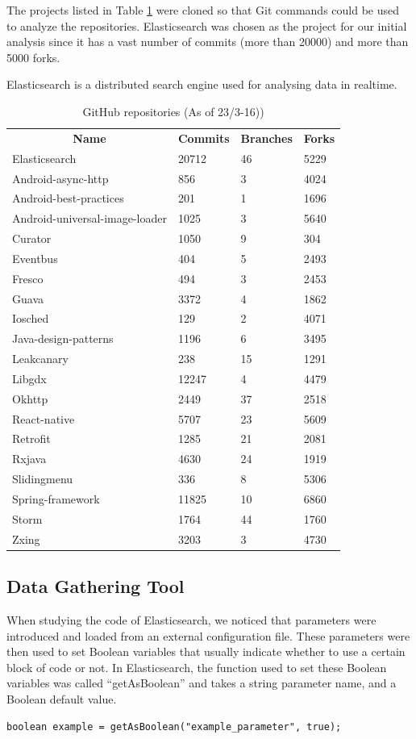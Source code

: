 The projects listed in Table \ref{table:repositories} were cloned so that Git commands could be used to analyze the repositories. Elasticsearch was chosen as the project for our initial analysis since it has a vast number of commits (more than 20000) and more than 5000 forks.

Elasticsearch is a distributed search engine used for analysing data in realtime.  %
\FloatBarrier
\begin{table}
\caption{GitHub repositories (As of 23/3-16))}\label{table:repositories}
\begin{tabular}{ l l l l}
\hline
\multicolumn{1}{c}{\textbf{Name}} & \multicolumn{1}{c}{\textbf{Commits}} & \multicolumn{1}{c}{\textbf{Branches}} & \multicolumn{1}{c}{\textbf{Forks}}\\
Elasticsearch & 20712 & 46 & 5229\\
Android-async-http & 856 & 3 & 4024\\
Android-best-practices & 201 & 1 & 1696\\
Android-universal-image-loader & 1025 & 3 & 5640\\
Curator & 1050 & 9 & 304\\
Eventbus & 404 & 5 & 2493\\
Fresco & 494 & 3 & 2453\\
Guava & 3372 & 4 & 1862\\
Iosched & 129 & 2 & 4071\\
Java-design-patterns & 1196 & 6 & 3495\\
Leakcanary & 238 & 15 & 1291\\
Libgdx & 12247 & 4 & 4479\\
Okhttp & 2449 & 37 & 2518\\
React-native & 5707 & 23 & 5609\\
Retrofit & 1285 & 21 & 2081\\
Rxjava & 4630 & 24 & 1919\\
Slidingmenu & 336 & 8 & 5306\\
Spring-framework & 11825 & 10 & 6860\\
Storm & 1764 & 44 & 1760\\
Zxing & 3203 & 3 & 4730
\end{tabular}
\end{table}
\FloatBarrier
\subsection{Data Gathering Tool}
When studying the code of Elasticsearch, we noticed that parameters were introduced and loaded from an external configuration file. These parameters were then used to set Boolean variables that usually indicate whether to use a certain block of code or not. In Elasticsearch, the function used to set these Boolean variables was called “getAsBoolean” and takes a string parameter name, and a Boolean default value.\\
\lstset{language=Java,numbers=left,xleftmargin=2em,frame=single,framexleftmargin=1.5em}
\begin{lstlisting}[frame=single,breaklines=true,tabsize=2]
boolean example = getAsBoolean("example_parameter", true);
\end{lstlisting}

